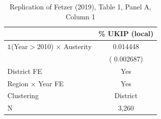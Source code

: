 \begin{table}[htbp]
\centering
\caption{Replication of Fetzer (2019), Table 1, Panel A, Column 1}
\label{tab:fetzer_t1c1}
\begin{tabular}{lc}
\hline\hline
 & \% UKIP (local) \\
\hline
$\mathbb{1}$(Year$>$2010) $\times$ Austerity &     0.014448 \\
 & (    0.002687) \\
\hline
District FE & Yes \\
Region $\times$ Year FE & Yes \\
Clustering & District \\
N &     3,260 \\
\hline\hline
\end{tabular}
\end{table}
